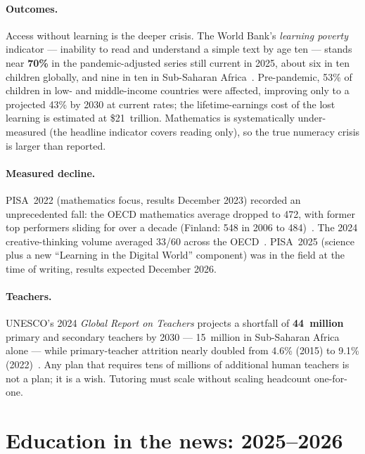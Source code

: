 \documentclass[11pt,a4paper]{article}
\let\oldsection\section
\renewcommand{\section}{\clearpage\oldsection}
\begin{document}
\paragraph{Outcomes.} Access without learning is the deeper crisis. The World
Bank's \emph{learning poverty} indicator --- inability to read and understand a
simple text by age ten --- stands near \textbf{70\%} in the pandemic-adjusted
series still current in 2025, about six in ten children globally, and nine in
ten in Sub-Saharan Africa~\cite{wb-cta-2025}. Pre-pandemic, 53\% of children in
low- and middle-income countries were affected, improving only to a projected
43\% by 2030 at current rates; the lifetime-earnings cost of the lost learning
is estimated at \$21~trillion. Mathematics is systematically under-measured
(the headline indicator covers reading only), so the true numeracy crisis is
larger than reported.

\paragraph{Measured decline.} PISA~2022 (mathematics focus, results December
2023) recorded an unprecedented fall: the OECD mathematics average dropped to
472, with former top performers sliding for over a decade (Finland: 548 in
2006 to 484)~\cite{oecd-pisa2022}. The 2024 creative-thinking volume averaged
33/60 across the OECD~\cite{oecd-pisa2022-creative}. PISA~2025 (science plus a
new ``Learning in the Digital World'' component) was in the field at the time
of writing, results expected December 2026.

\paragraph{Teachers.} UNESCO's 2024 \emph{Global Report on Teachers} projects a
shortfall of \textbf{44~million} primary and secondary teachers by
2030 --- 15~million in Sub-Saharan Africa alone --- while primary-teacher
attrition nearly doubled from 4.6\% (2015) to 9.1\% (2022)~\cite{unesco-teachers-2024}.
Any plan that requires tens of millions of additional human teachers is not a
plan; it is a wish. Tutoring must scale without scaling headcount one-for-one.

\section{Education in the news: 2025--2026}
\label{sec:news}
\end{document}
